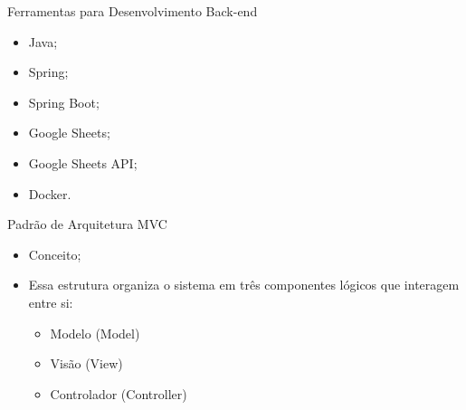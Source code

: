 \begin{frame}{Ferramentas para Desenvolvimento Back-end}
    \begin{itemize}
        \item Java; \vspace{0.5cm}
        \item Spring; \vspace{0.5cm}
        \item Spring Boot; \vspace{0.5cm}
        \item Google Sheets; \vspace{0.5cm}
        \item Google Sheets API; \vspace{0.5cm}
        \item Docker. \vspace{0.5cm}
    \end{itemize}
\end{frame}

\begin{frame}{Padrão de Arquitetura MVC}
    \begin{itemize}
        \item Conceito; \vspace{0.5cm}
        \item Essa estrutura organiza o sistema em três componentes lógicos que interagem entre si: \vspace{0.5cm}
        \begin{itemize}
            \item Modelo (Model) \vspace{0.5cm}
            \item Visão (View) \vspace{0.5cm}
            \item Controlador (Controller) \vspace{0.5cm}
        \end{itemize}
    \end{itemize}
\end{frame}


